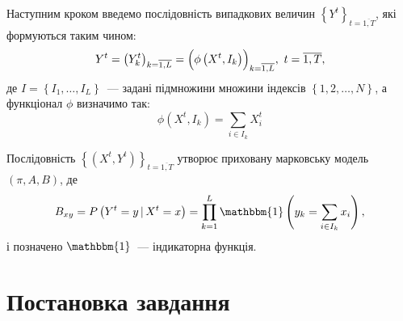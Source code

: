 \newpage
Наступним кроком введемо послідовність випадкових величин $\left\{ Y^t \right\}_{t=\overline{1,T}}$, які формуються таким чином: 
\begin{equation}\label{eq: observations}
    Y^t = \left( Y^t_k \right)_{k=\overline{1,L}} = \Bigl( \phi\left( X^t,I_k \right) \Bigr)_{k=\overline{1,L}},\ t=\overline{1,T},
\end{equation}
де $I=\left\{ I_1,\ldots,I_L \right\}$~--- задані підмножини множини індексів $\left\{ 1,2,\ldots,N \right\}$, а функціонал $\phi$ визначимо так:
\begin{equation}\label{eq: phi function}
    \phi\left( X^t,I_k \right) = \sum_{i \in I_k} X^t_i
\end{equation}

\begin{claim}
    Послідовність $\left\{ \left( X^t,Y^t \right) \right\}_{t=\overline{1,T}}$ утворює приховану марковську модель $\left( \pi,A,B \right)$, де 
    \begin{equation*}\label{eq: B emission probabilities}
        B_{xy}=P\left( Y^t=y\,|\,X^t=x \right) = \prod\limits_{k=1}^{L} \mathbbm{1}\left( y_k=\sum\limits_{i \in I_k} x_i \right),
    \end{equation*}
    і позначено $\mathbbm{1}$~--- індикаторна функція.
\end{claim}

\section{Постановка завдання}

